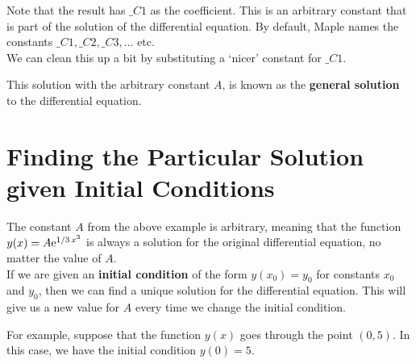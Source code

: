 \noindent
Note that the result has $\_C1$ as the coefficient. This is an arbitrary constant that is part of the solution of the differential equation. By default, Maple names the constants $\_C1, \_C2, \_C3, \ldots \text{ etc}$.\\

We can clean this up a bit by substituting a `nicer' constant for $\_C1$.


\begin{maplegroup}
	\begin{mapleinput}
	\end{mapleinput}
	\mapleresult
	\begin{maplelatex}
	\end{maplelatex}
\end{maplegroup}

\noindent
This solution with the arbitrary constant $A$, is known as the \textbf{general solution} to the differential equation.

\section{Finding the Particular Solution given Initial Conditions}
\label{sec:finding_particular_solution_given_IC}


The constant $A$ from the above example is arbitrary, meaning that the function $y(x)=A{\rm e}^{1/3\,{x}^{3}}$ is always a solution for the original differential equation, no matter the value of $A$.\\

If we are given an \textbf{initial condition} of the form $y(x_0)=y_0$ for constants $x_0$ and $y_0$, then we can find a unique solution for the differential equation. This will give us a new value for $A$ every time we change the initial condition.

For example, suppose that the function $y(x)$ goes through the point $(0,5)$. In this case, we have the initial condition $y(0)=5$.

